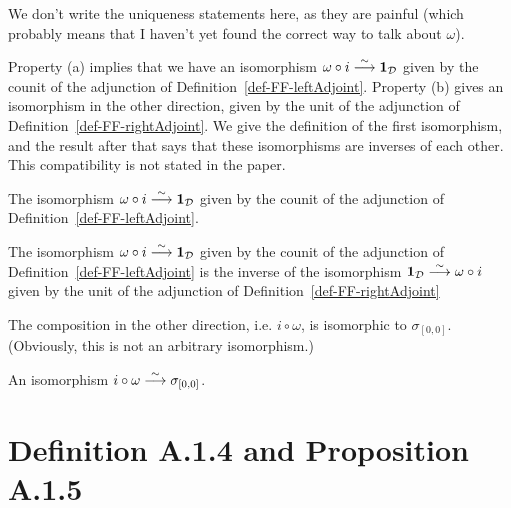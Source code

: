 We don't write the uniqueness statements here, as they are painful (which probably means
that I haven't yet found the correct way to talk about $\omega$).

Property (a) implies that we have an isomorphism $\omega\circ i \stackrel{\sim}{\longrightarrow} {\mathbf{1}}_{\mathcal{D}}$ given by the
counit of the adjunction of Definition~\ref{def-FF-leftAdjoint}.
Property (b) gives an isomorphism in the other direction, given by the unit of the adjunction of
Definition~\ref{def-FF-rightAdjoint}.
We give the definition of the first
isomorphism,
and the result after that
says that these isomorphisms are inverses of each other. This compatibility is not stated 
in the paper.

\begin{definition}
\label{def-FF-i}

The isomorphism $\omega\circ i \stackrel{\sim}{\longrightarrow} {\mathbf{1}}_{\mathcal{D}}$ given by the
counit of the adjunction of Definition~\ref{def-FF-leftAdjoint}.

\end{definition}

\begin{proposition}
\label{prop-FF-compat}

The isomorphism $\omega\circ i \stackrel{\sim}{\longrightarrow} {\mathbf{1}}_{\mathcal{D}}$ given by the
counit of the adjunction of Definition~\ref{def-FF-leftAdjoint} is the 
inverse of the isomorphism ${\mathbf{1}}_{\mathcal{D}}\stackrel{\sim}{\longrightarrow}\omega\circ i$ given by the
unit of the adjunction of Definition~\ref{def-FF-rightAdjoint}

\end{proposition}

The composition in the other direction, i.e. $i\circ\omega$, is isomorphic to $\sigma_{[0,0]}$.
(Obviously, this is not an arbitrary isomorphism.)

\begin{definition}
\label{def-i-FF}

An isomorphism $i\circ\omega\stackrel{\sim}{\longrightarrow}\sigma_{[0,0]}$.

\end{definition}


\section{Definition A.1.4 and Proposition A.1.5}

